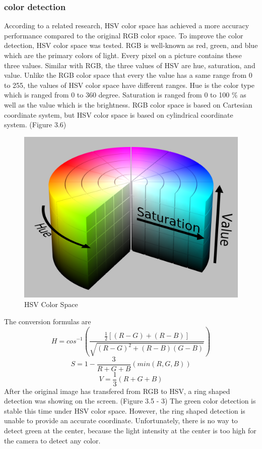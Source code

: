 \documentclass[letterpaper,12pt,oneside]{book}
\begin{document}
		\subsubsection{color detection}
		
		According to a related research, HSV color space has achieved a more accuracy performance compared to the original RGB color space. \cite{kaur2013content} To improve the color detection, HSV color space was tested. RGB is well-known as red, green, and blue which are the primary colors of light. Every pixel on a picture contains these three values. Similar with RGB, the three values of HSV are hue, saturation, and value. Unlike the RGB color space that every the value has a same range from 0 to 255, the values of HSV color space have different ranges. Hue is the color type which is ranged from 0 to 360 degree. Saturation is ranged from 0 to 100 $\%$ as well as the value which is the brightness. RGB color space is based on Cartesian coordinate system, but HSV color space is based on cylindrical coordinate system. (Figure 3.6)
		\begin{figure}[ht!]
			\begin{center}
				\includegraphics[scale = 0.2]{HSV.png}
				\caption{HSV Color Space}
			\end{center}
		\end{figure}
		
		The conversion formulas are
		\begin{equation}
			H = cos^{-1}(\frac{\frac{1}{2}[(R-G)+(R-B)]}{\sqrt{(R-G)^{2}+(R-B)(G-B)}})
		\end{equation}
		\begin{equation}
			S = 1-\frac{3}{R+G+B}(min(R,G,B))
		\end{equation}
		\begin{equation}
			V = \frac{1}{3}(R+G+B)
		\end{equation}
		After the original image has transfered from RGB to HSV, a ring shaped detection was showing on the screen. (Figure 3.5 - 3) The green color detection is stable this time under HSV color space. However, the ring shaped detection is unable to provide an accurate coordinate. Unfortunately, there is no way to detect green at the center, because the light intensity at the center is too high for the camera to detect any color.
\end{document}

